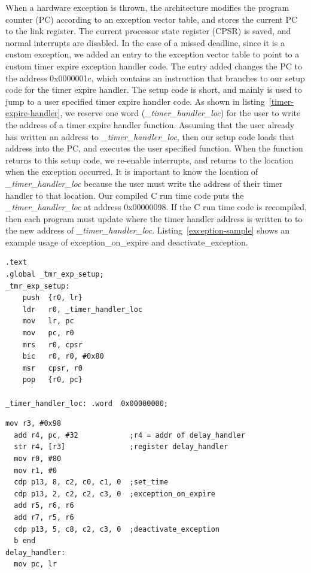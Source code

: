 When a hardware exception is thrown, the architecture modifies the program counter (PC) according to an exception vector table, and stores the current PC to the link register. 
The current processor state register (CPSR) is saved, and normal interrupts are disabled. 
In the case of a missed deadline, since it is a custom exception, we added an entry to the exception vector table to point to a custom timer expire exception handler code. 
The entry added changes the PC to the address 0x0000001c, which contains an instruction that branches to our setup code for the timer expire handler. 
The setup code is short, and mainly is used to jump to a user specified timer expire handler code.
As shown in listing~\ref{timer-expire-handler}, we reserve one word (\textit{\_timer\_handler\_loc}) for the user to write the address of a timer expire handler function. 
Assuming that the user already has written an address to \textit{\_timer\_handler\_loc}, then our setup code loads that address into the PC, and executes the user specified function. 
When the function returns to this setup code, we re-enable interrupts, and returns to the location when the exception occurred.
It is important to know the location of \textit{\_timer\_handler\_loc} because the user must write the address of their timer handler to that location.
Our compiled C run time code puts the \textit{\_timer\_handler\_loc} at address 0x00000098.
If the C run time code is recompiled, then each program must update where the timer handler address is written to to the new address of \textit{\_timer\_handler\_loc}.
Listing~\ref{exception-sample} shows an example usage of exception\_on\_expire and deactivate\_exception.    
\begin{lstlisting}[label=timer-expire-handler,caption=The custom timer expire setup code]
.text
.global _tmr_exp_setup;
_tmr_exp_setup:
    push  {r0, lr}
    ldr   r0, _timer_handler_loc 
    mov   lr, pc
    mov   pc, r0
    mrs   r0, cpsr
    bic   r0, r0, #0x80
    msr   cpsr, r0
    pop   {r0, pc}

_timer_handler_loc: .word  0x00000000;
\end{lstlisting}

\begin{lstlisting}[label=exception-sample,caption=Sample assembly code of exception\_on\_expire and deactivate\_exception ]
  mov r3, #0x98
  add r4, pc, #32            ;r4 = addr of delay_handler
  str r4, [r3]               ;register delay_handler
  mov r0, #80
  mov r1, #0
  cdp p13, 8, c2, c0, c1, 0  ;set_time
  cdp p13, 2, c2, c2, c3, 0  ;exception_on_expire
  add r5, r6, r6
  add r7, r5, r6
  cdp p13, 5, c8, c2, c3, 0  ;deactivate_exception
  b end
delay_handler:
  mov pc, lr
\end{lstlisting}

